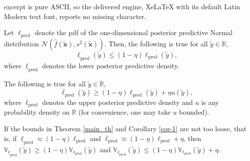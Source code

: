 \documentclass[10pt,a4paper]{amsart}
\newcommand{\x}{\boldsymbol{x}}
\begin{document}
excerpt is pure ASCII, so the delivered engine, XeLaTeX with its default Latin Modern text font, reports no missing character.
\begin{theorem}\label{main_th}
    Let $\ell_\text{pred}$ denote the pdf of the one-dimensional posterior predictive Normal distribution 
    $\mathcal{N}(\hat{f}(\tilde{\x}),s^2(\tilde{\x}))$. Then, the following is true for all $\tilde y \in \mathbb R$,
    $$\underline{\ell}_\text{pred}(\tilde y) \leq (1-\eta) \ell_\text{pred} (\tilde y),$$
    where $\underline{\ell}_\text{pred}$ denotes the lower posterior predictive density.
\end{theorem}

\begin{corollary}\label{cor-1}
    The following is true for all $\tilde{y}\in\mathbb{R}$,
    \[
    \overline{\ell}_\text{pred}(\tilde{y}) \ge (1-\eta) \ell_\text{pred}(\tilde{y}) + \eta u(\tilde{y}),
    \]
    where $\overline{\ell}_\text{pred}$ denotes the upper posterior predictive density and
    $u$ is any probability density on $\mathbb{R}$ (for convenience, one may take $u$ bounded).
\end{corollary}

\begin{corollary}\label{cor-3}
    If the bounds in Theorem \ref{main_th} and Corollary \ref{cor-1} are not too loose, that is, if $\underline{\ell}_\text{pred} \approx (1-\eta) \ell_\text{pred}$ and $\overline{\ell}_\text{pred} \approx (1-\eta) \ell_\text{pred} +\eta$, then $\mathbb{V}_{\underline{\ell}_\text{pred}}(\tilde{y}) \geq (1-\eta) \mathbb{V}_{\ell_\text{pred}}(\tilde{y})$ and $\mathbb{V}_{\overline{\ell}_\text{pred}}(\tilde{y}) \leq (1-\eta) \mathbb{V}_{{\ell}_\text{pred}}(\tilde{y}) + \eta$.
\end{corollary}
\end{document}
